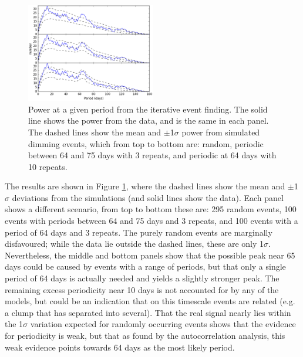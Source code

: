 \documentclass[useAMS,usenatbib,usegraphicx]{mn2e}
\begin{document}
\begin{figure}
  \begin{center}
    \hspace{-0.5cm} \includegraphics[width=0.5\textwidth]{figs/hist_single.ps}
    \caption{Power at a given period from the iterative event finding. The solid line
      shows the power from the data, and is the same in each panel. The dashed lines show
      the mean and $\pm$1$\sigma$ power from simulated dimming events, which from top to
      bottom are: random, periodic between 64 and 75 days with 3 repeats, and periodic at
      64 days with 10 repeats.}\label{fig:hist}
  \end{center}
\end{figure}

The results are shown in Figure \ref{fig:hist}, where the dashed lines show the mean and
$\pm$1$\sigma$ deviations from the simulations (and solid lines show the data). Each
panel shows a different scenario, from top to bottom these are: 295 random events, 100
events with periods between 64 and 75 days and 3 repeats, and 100 events with a period of
64 days and 3 repeats. The purely random events are marginally disfavoured; while the
data lie outside the dashed lines, these are only 1$\sigma$. Nevertheless, the middle and
bottom panels show that the possible peak near 65 days could be caused by events with a
range of periods, but that only a single period of 64 days is actually needed and yields
a slightly stronger peak. The remaining excess periodicity near 10 days is not accounted
for by any of the models, but could be an indication that on this timescale events are
related (e.g. a clump that has separated into several). That the real signal nearly lies
within the 1$\sigma$ variation expected for randomly occurring events shows that the
evidence for periodicity is weak, but that as found by the autocorrelation analysis, this
weak evidence points towards 64 days as the most likely period.
\end{document}
